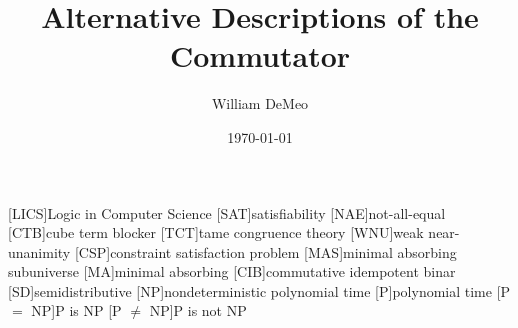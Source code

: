 [LICS]{Logic in Computer Science}
[SAT]{satisfiability}
[NAE]{not-all-equal}
[CTB]{cube term blocker}
[TCT]{tame congruence theory}
[WNU]{weak near-unanimity}
[CSP]{constraint satisfaction problem}
[MAS]{minimal absorbing subuniverse}
[MA]{minimal absorbing}
[CIB]{commutative idempotent binar}
[SD]{semidistributive}
[NP]{nondeterministic polynomial time}
[P]{polynomial time}
[P $ = $ NP]{P is NP}
[P $ \neq $ NP]{P is not NP}


\usepackage{inputs/proof-dashed}



\usepackage{inputs/macros}



\title{Alternative Descriptions of the Commutator}
\date{\today}
\author[W.~DeMeo]{William DeMeo}
\address{University of Hawaii}


\maketitle

\renewcommand{\etaR}{\ensuremath{\eta}}



